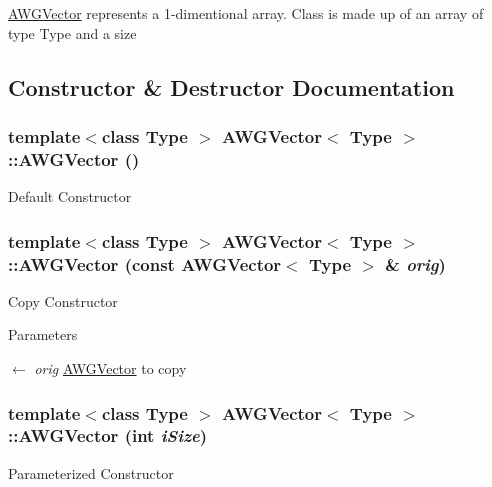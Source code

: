 \hyperlink{classAWGVector}{AWGVector} represents a 1-\/dimentional array. Class is made up of an array of type Type and a size 

\subsection{Constructor \& Destructor Documentation}
\hypertarget{classAWGVector_a52d2aeaf8a3239b0fd5d48aceba3d050}{
\subsubsection[{AWGVector}]{\setlength{\rightskip}{0pt plus 5cm}template$<$class Type $>$ {\bf AWGVector}$<$ Type $>$::{\bf AWGVector} ()}}
\label{classAWGVector_a52d2aeaf8a3239b0fd5d48aceba3d050}
Default Constructor \hypertarget{classAWGVector_a91bbe006772288e4942802ef734d2b4e}{
\subsubsection[{AWGVector}]{\setlength{\rightskip}{0pt plus 5cm}template$<$class Type $>$ {\bf AWGVector}$<$ Type $>$::{\bf AWGVector} (const {\bf AWGVector}$<$ Type $>$ \& {\em orig})}}
\label{classAWGVector_a91bbe006772288e4942802ef734d2b4e}
Copy Constructor


\begin{DoxyParams}{Parameters}
\item[\mbox{$\leftarrow$} {\em orig}]\hyperlink{classAWGVector}{AWGVector} to copy \end{DoxyParams}
\hypertarget{classAWGVector_a3c2c1e2132e9777524c6509bafcb8133}{
\subsubsection[{AWGVector}]{\setlength{\rightskip}{0pt plus 5cm}template$<$class Type $>$ {\bf AWGVector}$<$ Type $>$::{\bf AWGVector} (int {\em iSize})}}
\label{classAWGVector_a3c2c1e2132e9777524c6509bafcb8133}
Parameterized Constructor


